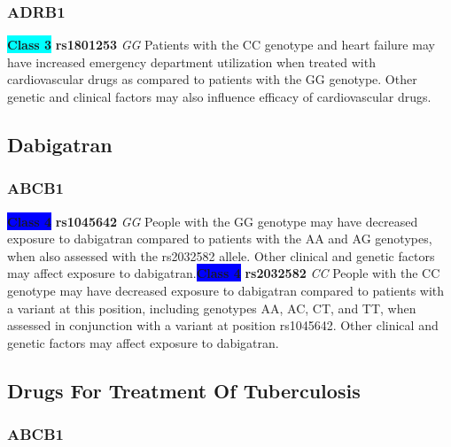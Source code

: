 \documentclass{book}
\begin{document}
\subsubsection{ ADRB1 }

\begin{center}
\textbf{\colorbox{cyan} {Class 3}} \textbf{ rs1801253 } \textit{ GG }
Patients with the CC genotype and heart failure may have increased emergency department utilization when treated with cardiovascular drugs as compared to patients with the GG genotype. Other genetic and clinical factors may also influence efficacy of cardiovascular drugs.


\end{center}\subsection{ Dabigatran }


\subsubsection{ ABCB1 }

\begin{center}

\textbf{\colorbox{blue} {Class 4}} \textbf{ rs1045642 } \textit{ GG }
People with the GG genotype may have decreased exposure to dabigatran compared to patients with the AA and AG genotypes, when also assessed with the rs2032582 allele. Other clinical and genetic factors may affect exposure to dabigatran.\textbf{\colorbox{blue} {Class 4}} \textbf{ rs2032582 } \textit{ CC }
People with the CC genotype may have decreased exposure to dabigatran compared to patients with a variant at this position, including genotypes AA, AC, CT, and TT, when assessed in conjunction with a variant at position rs1045642. Other clinical and genetic factors may affect exposure to dabigatran. 

\end{center}\subsection{ Drugs For Treatment Of Tuberculosis }


\subsubsection{ ABCB1 }
\end{document}
